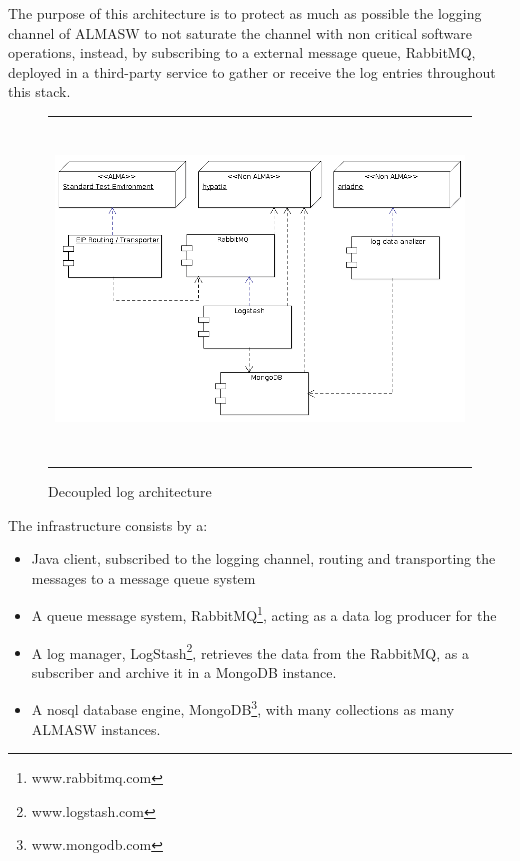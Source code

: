 \documentclass[]{spie}  %
\begin{document}
The purpose of this architecture is to protect as much as possible the logging 
channel of ALMASW to not saturate the channel with non critical software operations, 
instead, by subscribing to a external message queue, RabbitMQ, deployed in a 
third-party service to gather or receive the log entries throughout this stack.

\begin{figure}[!ht]
 \begin{center}
 \begin{tabular}{c}
 \includegraphics[height=9.0cm]{../img/DeploymentDiagram.png}
 \end{tabular}
 \end{center}
 \caption[dc] 
 { \label{fig:dc} Decoupled log architecture}
 \end{figure}

The infrastructure consists by a:

\begin{itemize}
\item Java client, subscribed to the logging channel, routing and transporting 
the messages to a message queue system
\item A queue message system, RabbitMQ\footnote{www.rabbitmq.com}, acting as a 
data log producer for the
\item A log manager, LogStash\footnote{www.logstash.com}, retrieves the data from 
the RabbitMQ, as a subscriber and archive it in a MongoDB instance.
\item A nosql database engine, MongoDB\footnote{www.mongodb.com}, with many collections 
as many ALMASW instances.
\end{itemize}
\end{document}
